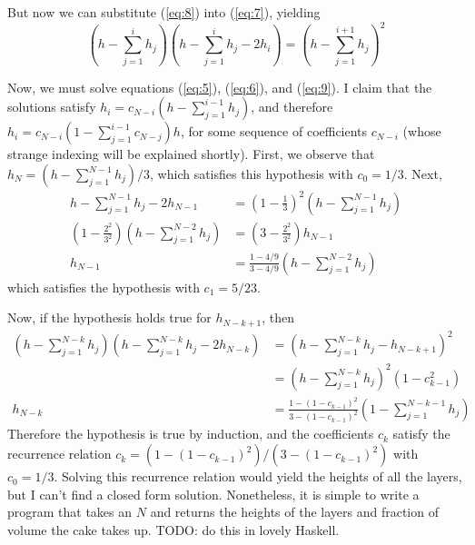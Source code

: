\documentclass[12pt]{article}
\begin{document}
But now we can substitute (\ref{eq:8}) into (\ref{eq:7}), yielding
\begin{equation}
  \label{eq:9}
  \left( h - \sum_{j=1}^i h_j \right) \left( h - \sum_{j=1}^i h_j - 2h_i \right) = \left( h - \sum_{j=1}^{i+1}h_j \right)^2
\end{equation}

Now, we must solve equations (\ref{eq:5}), (\ref{eq:6}), and (\ref{eq:9}). I claim that the solutions satisfy $h_i = c_{N-i}(h - \sum_{j=1}^{i-1}h_j)$, and therefore $h_i = c_{N-i}(1 - \sum_{j=1}^{i-1}c_{N-j})h$, for some sequence of coefficients $c_{N-i}$ (whose strange indexing will be explained shortly). First, we observe that $h_N = (h - \sum_{j=1}^{N-1}h_j)/3$, which satisfies this hypothesis with $c_0 = 1/3$. Next,
\begin{align*}
  h - \sum_{j=1}^{N-1}h_j - 2h_{N-1} &= \left( 1 - \frac{1}{3} \right)^2 \left( h - \sum_{j=1}^{N-1}h_j \right) \\
  \left( 1 - \frac{2^2}{3^2} \right)\left( h - \sum_{j=1}^{N-2}h_j \right) &= \left( 3 - \frac{2^2}{3^2} \right)h_{N-1}\\
  h_{N-1} &= \frac{1 - 4/9}{3-4/9} \left( h - \sum_{j=1}^{N-2}h_j \right)
\end{align*}
which satisfies the hypothesis with $c_1 = 5/23$.

Now, if the hypothesis holds true for $h_{N-k+1}$, then
\begin{align*}
  \left( h - \sum_{j=1}^{N-k}h_j \right) \left( h - \sum_{j=1}^{N-k}h_j - 2h_{N-k} \right) &= \left( h - \sum_{j=1}^{N-k}h_j - h_{N-k+1} \right)^2 \\
                                                                                           &= \left( h - \sum_{j=1}^{N-k}h_j \right)^2 \left( 1 - c_{k-1}^2 \right)\\
  h_{N-k} &= \frac{1 - (1-c_{k-1})^2}{3-(1-c_{k-1})^2}\left( 1 - \sum_{j=1}^{N-k-1}h_j \right)
\end{align*}
Therefore the hypothesis is true by induction, and the coefficients $c_k$ satisfy the recurrence relation $c_k = (1-(1-c_{k-1})^2)/(3-(1-c_{k-1})^2)$ with $c_0 = 1/3$. Solving this recurrence relation would yield the heights of all the layers, but I can't find a closed form solution. Nonetheless, it is simple to write a program that takes an $N$ and returns the heights of the layers and fraction of volume the cake takes up. TODO: do this in lovely Haskell.
\end{document}

